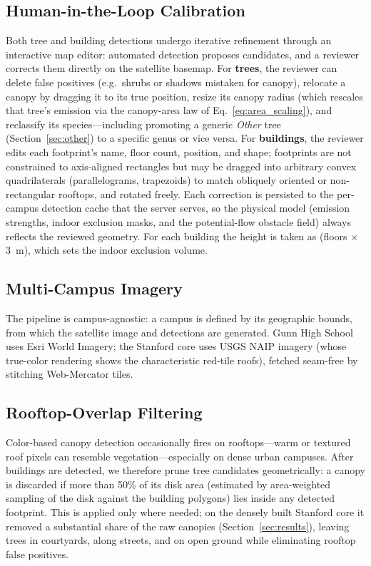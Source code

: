 \documentclass[11pt]{article}
\begin{document}
\subsection{Human-in-the-Loop Calibration}
\label{sec:hitl}

Both tree and building detections undergo iterative refinement through an interactive map editor: automated detection proposes candidates, and a reviewer corrects them directly on the satellite basemap. For \textbf{trees}, the reviewer can delete false positives (e.g.\ shrubs or shadows mistaken for canopy), relocate a canopy by dragging it to its true position, resize its canopy radius (which rescales that tree's emission via the canopy-area law of Eq.~\eqref{eq:area_scaling}), and reclassify its species---including promoting a generic \emph{Other} tree (Section~\ref{sec:other}) to a specific genus or vice versa. For \textbf{buildings}, the reviewer edits each footprint's name, floor count, position, and shape; footprints are not constrained to axis-aligned rectangles but may be dragged into arbitrary convex quadrilaterals (parallelograms, trapezoids) to match obliquely oriented or non-rectangular rooftops, and rotated freely. Each correction is persisted to the per-campus detection cache that the server serves, so the physical model (emission strengths, indoor exclusion masks, and the potential-flow obstacle field) always reflects the reviewed geometry. For each building the height is taken as (floors $\times$ 3~m), which sets the indoor exclusion volume.

\subsection{Multi-Campus Imagery}

The pipeline is campus-agnostic: a campus is defined by its geographic bounds, from which the satellite image and detections are generated. Gunn High School uses Esri World Imagery; the Stanford core uses USGS NAIP imagery (whose true-color rendering shows the characteristic red-tile roofs), fetched seam-free by stitching Web-Mercator tiles.

\subsection{Rooftop-Overlap Filtering}
\label{sec:overlapfilter}

Color-based canopy detection occasionally fires on rooftops---warm or textured roof pixels can resemble vegetation---especially on dense urban campuses. After buildings are detected, we therefore prune tree candidates geometrically: a canopy is discarded if more than 50\% of its disk area (estimated by area-weighted sampling of the disk against the building polygons) lies inside any detected footprint. This is applied only where needed; on the densely built Stanford core it removed a substantial share of the raw canopies (Section~\ref{sec:results}), leaving trees in courtyards, along streets, and on open ground while eliminating rooftop false positives.
\end{document}
